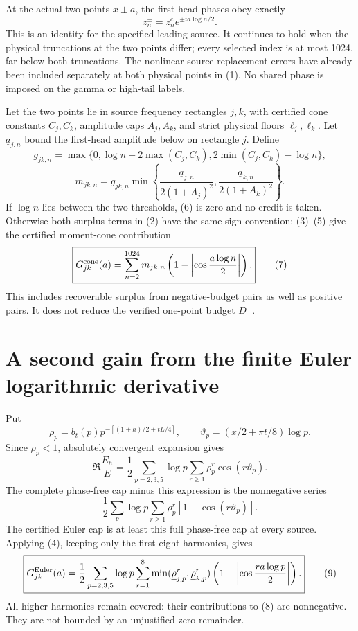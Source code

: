 \documentclass[11pt,a4paper]{article}
\begin{document}
At the actual two points \(x\pm a\), the first-head phases obey exactly
\[
 z_n^\pm=z_n^c e^{\pm ia\log n/2}.
\tag{5}
\]
This is an identity for the specified leading source. It continues to hold
when the physical truncations at the two points differ; every selected index
is at most 1024, far below both truncations. The nonlinear source replacement
errors have already been included separately at both physical points in (1).
No shared phase is imposed on the gamma or high-tail labels.

Let the two points lie in source frequency rectangles \(j,k\), with certified
cone constants \(C_j,C_k\), amplitude caps \(A_j,A_k\), and strict physical
floors \(\ell_j,\ell_k\). Let \(\underline a_{j,n}\) bound the first-head
amplitude below on rectangle \(j\). Define
\[
 g_{jk,n}=\max\{0,\log n-2\max(C_j,C_k),
                       2\min(C_j,C_k)-\log n\},
\]
\[
 m_{jk,n}=g_{jk,n}\min\left\{
 \frac{\underline a_{j,n}}{2(1+A_j)^2},
 \frac{\underline a_{k,n}}{2(1+A_k)^2}\right\}.
\tag{6}
\]
If \(\log n\) lies between the two thresholds, (6) is zero and no credit is
taken. Otherwise both surplus terms in (2) have the same sign convention;
(3)--(5) give the certified moment-cone contribution
\[
 \boxed{G^{\rm cone}_{jk}(a)
 =\sum_{n=2}^{1024}m_{jk,n}
     \left(1-\left|\cos\frac{a\log n}{2}\right|\right).}
 \tag{7}
\]
This includes recoverable surplus from negative-budget pairs as well as
positive pairs. It does not reduce the verified one-point budget \(D_+\).

\section{A second gain from the finite Euler logarithmic derivative}\label{a-second-gain-from-the-finite-euler-logarithmic-derivative}

Put
\[
 \rho_p=b_t(p)p^{-[(1+h)/2+tL/4]},\qquad
 \vartheta_p=(x/2+\pi t/8)\log p.
\]
Since \(\rho_p<1\), absolutely convergent expansion gives
\[
 \Re\frac{E_h}{E}
 =\frac12\sum_{p=2,3,5}\log p\sum_{r\ge1}
        \rho_p^r\cos(r\vartheta_p).
\]
The complete phase-free cap minus this expression is the nonnegative series
\[
 \frac12\sum_p\log p\sum_{r\ge1}
        \rho_p^r[1-\cos(r\vartheta_p)].
\tag{8}
\]
The certified Euler cap is at least this full phase-free cap at every source.
Applying (4), keeping only the first eight harmonics, gives
\[
 \boxed{G^{\rm Euler}_{jk}(a)=
 \frac12\sum_{p=2,3,5}\log p\sum_{r=1}^8
 \min(\underline\rho_{j,p}^r,\underline\rho_{k,p}^r)
 \left(1-\left|\cos\frac{ra\log p}{2}\right|\right).}
 \tag{9}
\]
All higher harmonics remain covered: their contributions to (8) are
nonnegative. They are not bounded by an unjustified zero remainder.
\end{document}
